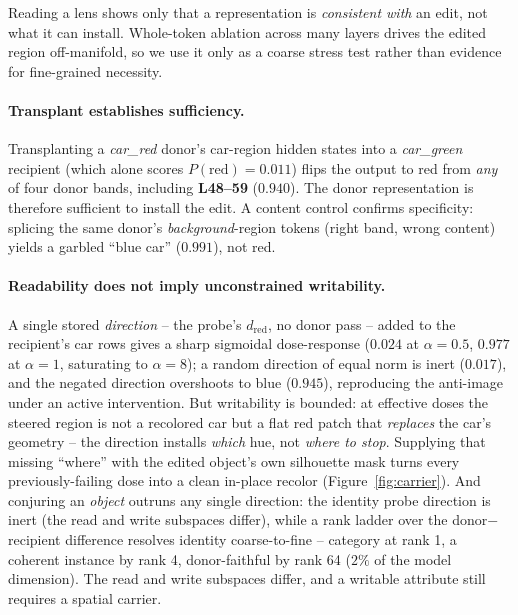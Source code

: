 \documentclass[letterpaper]{article} %
\begin{document}
Reading a lens shows only that a representation is \emph{consistent with}
an edit, not what it can install. Whole-token ablation across many layers
drives the edited region off-manifold, so we use it only as a coarse stress
test rather than evidence for fine-grained necessity.

\paragraph{Transplant establishes sufficiency.} Transplanting a
\emph{car\_red} donor's car-region hidden states into a \emph{car\_green}
recipient (which alone scores $P(\text{red}){=}0.011$) flips the output to
red from \emph{any} of four donor bands, including \textbf{L48--59}
($0.940$). The donor representation is therefore sufficient to install
the edit. A content control confirms specificity: splicing the same
donor's \emph{background}-region tokens (right band, wrong content) yields
a garbled ``blue car'' ($0.991$), not red.

\paragraph{Readability does not imply unconstrained writability.} A single stored
\emph{direction} -- the probe's $d_{\text{red}}$, no donor pass -- added to
the recipient's car rows gives a sharp sigmoidal dose-response ($0.024$ at
$\alpha{=}0.5$, $0.977$ at $\alpha{=}1$, saturating to $\alpha{=}8$); a
random direction of equal norm is inert ($0.017$), and the negated
direction overshoots to blue ($0.945$), reproducing the anti-image under
an active intervention. But writability is bounded: at effective doses the
steered region is not a recolored car but a flat red patch that
\emph{replaces} the car's geometry -- the direction installs \emph{which}
hue, not \emph{where to stop}. Supplying that missing ``where'' with the
edited object's own silhouette mask turns every previously-failing dose
into a clean in-place recolor (Figure~\ref{fig:carrier}). And conjuring an
\emph{object} outruns any single direction: the
identity probe direction is inert (the read and write subspaces
differ), while a rank ladder over the donor$-$recipient difference
resolves identity coarse-to-fine -- category at rank 1, a coherent
instance by rank 4, donor-faithful by rank 64 ($2\%$ of the model
dimension). The read and write subspaces differ, and a writable attribute
still requires a spatial carrier.
\end{document}
